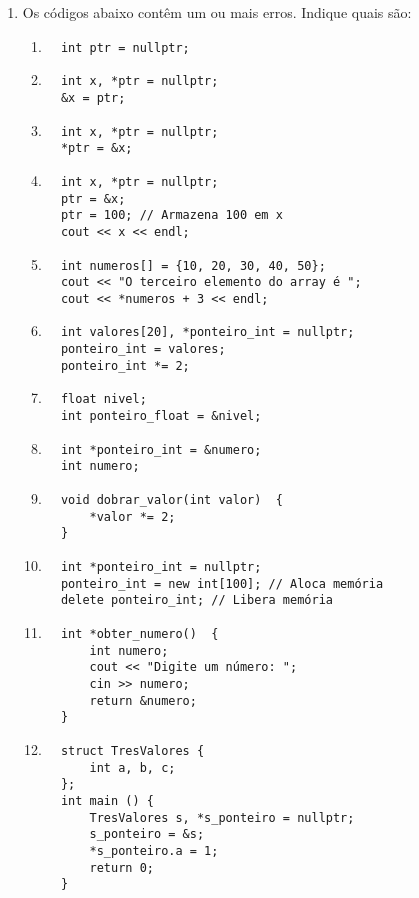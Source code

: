 \documentclass[12pt]{article}
\begin{document}
\begin{enumerate}
    \item Os códigos abaixo contêm um ou mais erros. Indique quais são:
    \begin{enumerate}
      \item \begin{verbatim}
  int ptr = nullptr;                  
      \end{verbatim}
      \item \begin{verbatim}
  int x, *ptr = nullptr; 
  &x = ptr;
      \end{verbatim}
      \item \begin{verbatim}
  int x, *ptr = nullptr;
  *ptr = &x;
      \end{verbatim}
      \item \begin{verbatim}
  int x, *ptr = nullptr;
  ptr = &x;
  ptr = 100; // Armazena 100 em x  
  cout << x << endl;
      \end{verbatim}
      \item \begin{verbatim}
  int numeros[] = {10, 20, 30, 40, 50};
  cout << "O terceiro elemento do array é ";
  cout << *numeros + 3 << endl;
      \end{verbatim}
      \item \begin{verbatim}
  int valores[20], *ponteiro_int = nullptr;
  ponteiro_int = valores;
  ponteiro_int *= 2;
      \end{verbatim}
      \item \begin{verbatim}
  float nivel;
  int ponteiro_float = &nivel;
      \end{verbatim}
      \item \begin{verbatim}
  int *ponteiro_int = &numero;
  int numero;
      \end{verbatim}
      \item \begin{verbatim}
  void dobrar_valor(int valor)  {
      *valor *= 2;
  }
      \end{verbatim}
      \item \begin{verbatim}
  int *ponteiro_int = nullptr; 
  ponteiro_int = new int[100]; // Aloca memória
  delete ponteiro_int; // Libera memória
      \end{verbatim}
      \item \begin{verbatim}
  int *obter_numero()  {
      int numero;  
      cout << "Digite um número: "; 
      cin >> numero; 
      return &numero;  
  }
      \end{verbatim}
      \item \begin{verbatim}
  struct TresValores {  
      int a, b, c; 
  };
  int main () {  
      TresValores s, *s_ponteiro = nullptr; 
      s_ponteiro = &s; 
      *s_ponteiro.a = 1; 
      return 0;
  }
      \end{verbatim}
  \end{enumerate}
  


\end{enumerate}
\end{document}
